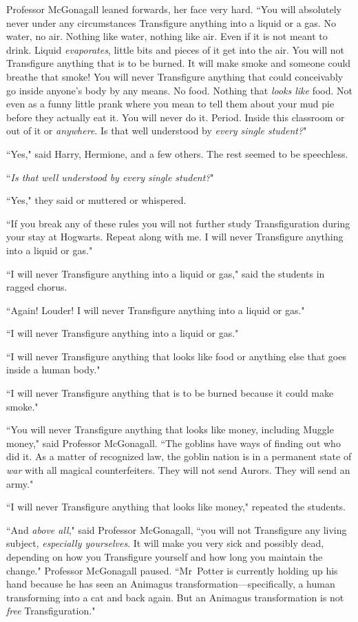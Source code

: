Professor McGonagall leaned forwards, her face very hard. ``You will absolutely never under any circumstances Transfigure anything into a liquid or a gas. No water, no air. Nothing like water, nothing like air. Even if it is not meant to drink. Liquid \emph{evaporates}, little bits and pieces of it get into the air. You will not Transfigure anything that is to be burned. It will make smoke and someone could breathe that smoke! You will never Transfigure anything that could conceivably go inside anyone's body by any means. No food. Nothing that \emph{looks like} food. Not even as a funny little prank where you mean to tell them about your mud pie before they actually eat it. You will never do it. Period. Inside this classroom or out of it or \emph{anywhere}. Is that well understood by \emph{every single student?}"

``Yes," said Harry, Hermione, and a few others. The rest seemed to be speechless.

``\emph{Is that well understood by every single student?}"

``Yes," they said or muttered or whispered.

``If you break any of these rules you will not further study Transfiguration during your stay at Hogwarts. Repeat along with me. I will never Transfigure anything into a liquid or gas."

``I will never Transfigure anything into a liquid or gas," said the students in ragged chorus.

``Again! Louder! I will never Transfigure anything into a liquid or gas."

``I will never Transfigure anything into a liquid or gas."

``I will never Transfigure anything that looks like food or anything else that goes inside a human body."

``I will never Transfigure anything that is to be burned because it could make smoke."

``You will never Transfigure anything that looks like money, including Muggle money," said Professor McGonagall. ``The goblins have ways of finding out who did it. As a matter of recognized law, the goblin nation is in a permanent state of \emph{war} with all magical counterfeiters. They will not send Aurors. They will send an army."

``I will never Transfigure anything that looks like money," repeated the students.

``And \emph{above all}," said Professor McGonagall, ``you will not Transfigure any living subject, \emph{especially yourselves}. It will make you very sick and possibly dead, depending on how you Transfigure yourself and how long you maintain the change." Professor McGonagall paused. ``Mr~Potter is currently holding up his hand because he has seen an Animagus transformation—specifically, a human transforming into a cat and back again. But an Animagus transformation is not \emph{free} Transfiguration."

